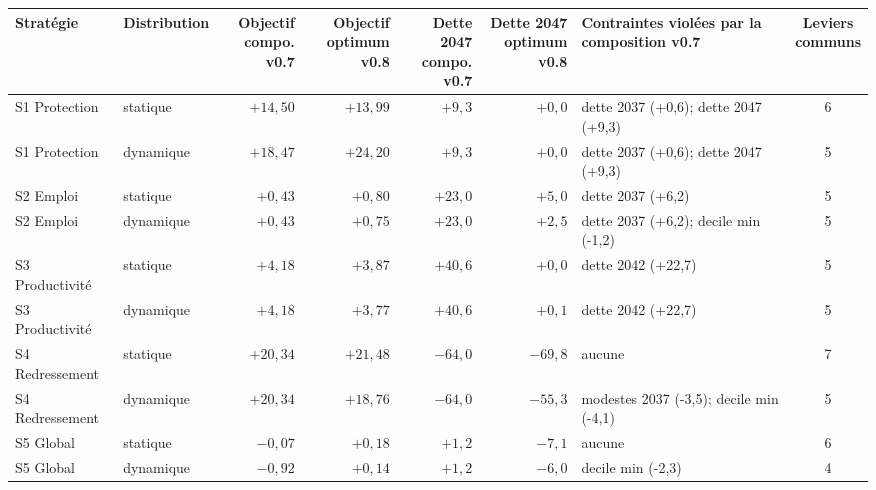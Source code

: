 \begin{tabular}{llrrrrp{4.2cm}c}\toprule
Stratégie & Distribution & \makecell{Objectif\\ compo. v0.7} & \makecell{Objectif\\ optimum v0.8} & \makecell{Dette 2047\\ compo. v0.7} & \makecell{Dette 2047\\ optimum v0.8} & Contraintes violées par la composition v0.7 & \makecell{Leviers\\ communs} \\ \midrule
S1 Protection & statique & $+14{,}50$ & $+13{,}99$ & $+9{,}3$ & $+0{,}0$ & dette 2037 (+0,6); dette 2047 (+9,3) & 6 \\
S1 Protection & dynamique & $+18{,}47$ & $+24{,}20$ & $+9{,}3$ & $+0{,}0$ & dette 2037 (+0,6); dette 2047 (+9,3) & 5 \\
S2 Emploi & statique & $+0{,}43$ & $+0{,}80$ & $+23{,}0$ & $+5{,}0$ & dette 2037 (+6,2) & 5 \\
S2 Emploi & dynamique & $+0{,}43$ & $+0{,}75$ & $+23{,}0$ & $+2{,}5$ & dette 2037 (+6,2); decile min  (-1,2) & 5 \\
S3 Productivité & statique & $+4{,}18$ & $+3{,}87$ & $+40{,}6$ & $+0{,}0$ & dette 2042 (+22,7) & 5 \\
S3 Productivité & dynamique & $+4{,}18$ & $+3{,}77$ & $+40{,}6$ & $+0{,}1$ & dette 2042 (+22,7) & 5 \\
S4 Redressement & statique & $+20{,}34$ & $+21{,}48$ & $-64{,}0$ & $-69{,}8$ & aucune & 7 \\
S4 Redressement & dynamique & $+20{,}34$ & $+18{,}76$ & $-64{,}0$ & $-55{,}3$ & modestes 2037 (-3,5); decile min  (-4,1) & 5 \\
S5 Global & statique & $-0{,}07$ & $+0{,}18$ & $+1{,}2$ & $-7{,}1$ & aucune & 6 \\
S5 Global & dynamique & $-0{,}92$ & $+0{,}14$ & $+1{,}2$ & $-6{,}0$ & decile min  (-2,3) & 4 \\
\bottomrule\end{tabular}
